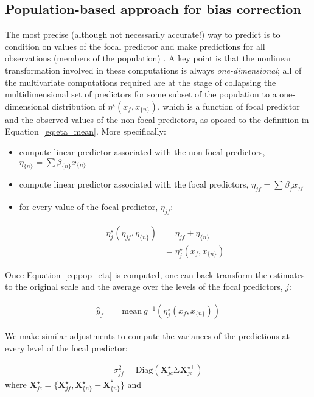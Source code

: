 \documentclass[10pt,letterpaper]{article}
\newcommand{\bX}{{\mathbf X}}
\newcommand{\nset}[1]{#1_{\{n\}}}
\begin{document}
\subsection*{Population-based approach for bias correction}

The most precise (although not necessarily accurate!) way to predict is to condition on values of the focal predictor and make predictions for all observations (members of the population) \cite{hanmer2013behind}. A key point is that the nonlinear transformation involved in these computations is always \emph{one-dimensional}; all of the multivariate computations required are at the stage of collapsing the multidimensional set of predictors for some subset of the population to a one-dimensional distribution of $\eta^\star(x_f, \nset{x})$, which is a function of focal predictor and the observed values of the non-focal predictors, as oposed to the definition in Equation~\ref{eq:eta_mean}. More specifically:

\begin{itemize}
\item compute linear predictor associated with the non-focal predictors, $\nset{\eta} = \sum \nset{\beta} \nset{x}$
\item compute linear predictor associated with the focal predictors, $\eta_{jf} = \sum{\beta_f x_{jf}}$
\item for every value of the focal predictor, $\eta_{jf}$:

\begin{align}\label{eq:pop_eta} 
\eta_j^\star(\eta_{jf}, \nset{\eta})  &= \eta_{jf} + \nset{\eta} \nonumber \\
&= \eta_j^\star(x_f, \nset{x})
\end{align}
\end{itemize}

Once Equation~\ref{eq:pop_eta} is computed, one can back-transform the estimates to the original scale and the average over the levels of the focal predictors, $j$:

\begin{align}\label{eq:pop_response} 
\hat{y}_f  &= \textrm{mean} ~ g^{-1} \left(\eta_j^\star(x_f, \nset{x})\right)
\end{align}

We make similar adjustments to compute the variances of the predictions at every level of the focal predictor:

\begin{align}
\sigma_{jf}^2 = \textrm{Diag}(\bX^\star_{jc} \Sigma \bX^{\star\top}_{jc})
\end{align}
where $\bX^{\star}_{jc} = \{\bX_{jf}^\star, \nset{{\bX}^\star} - \nset{{\bar{\bX}}^\star}\}$ and 
\end{document}
